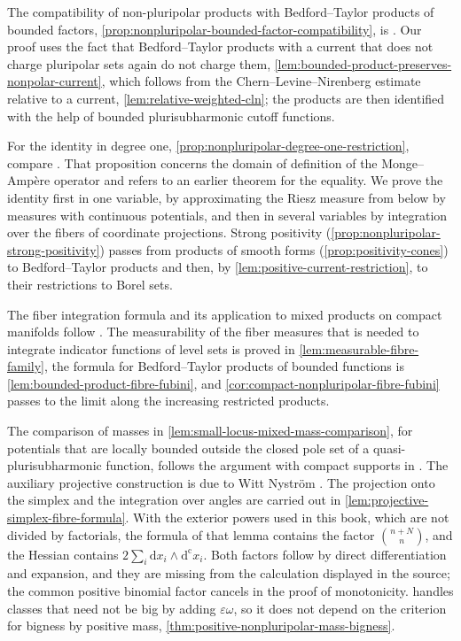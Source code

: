 The compatibility of non-pluripolar products with Bedford--Taylor products of bounded factors, \cref{prop:nonpluripolar-bounded-factor-compatibility}, is \cite[Proposition~2.2.1(iii)]{XiaSampleBook}. Our proof uses the fact that Bedford--Taylor products with a current that does not charge pluripolar sets again do not charge them, \cref{lem:bounded-product-preserves-nonpolar-current}, which follows from the Chern--Levine--Nirenberg estimate relative to a current, \cref{lem:relative-weighted-cln}; the products are then identified with the help of bounded plurisubharmonic cutoff functions.

For the identity in degree one, \cref{prop:nonpluripolar-degree-one-restriction}, compare \cite[Proposition 3.3]{ElKadiri2023v3}. That proposition concerns the domain of definition of the Monge--Amp\`ere operator and refers to an earlier theorem for the equality. We prove the identity first in one variable, by approximating the Riesz measure from below by measures with continuous potentials, and then in several variables by integration over the fibers of coordinate projections. Strong positivity (\cref{prop:nonpluripolar-strong-positivity}) passes from products of smooth forms (\cref{prop:positivity-cones}) to Bedford--Taylor products and then, by \cref{lem:positive-current-restriction}, to their restrictions to Borel sets.

The fiber integration formula and its application to mixed products on compact manifolds follow \cite[Chapter on non-pluripolar products, Lemma 2.1.1 and Corollary 2.2.1]{XiaSampleBook}. The measurability of the fiber measures that is needed to integrate indicator functions of level sets is proved in \cref{lem:measurable-fibre-family}, the formula for Bedford--Taylor products of bounded functions is \cref{lem:bounded-product-fibre-fubini}, and \cref{cor:compact-nonpluripolar-fibre-fubini} passes to the limit along the increasing restricted products.

The comparison of masses in \cref{lem:small-locus-mixed-mass-comparison}, for potentials that are locally bounded outside the closed pole set of a quasi-plurisubharmonic function, follows the argument with compact supports in \cite[Theorem 1.16 and its proof]{BEGZ10}. The auxiliary projective construction is due to Witt Nystr\"om \cite[Sections 3--4]{WN19}. The projection onto the simplex and the integration over angles are carried out in \cref{lem:projective-simplex-fibre-formula}. With the exterior powers used in this book, which are not divided by factorials, the formula of that lemma contains the factor $\binom{n+N}{n}$, and the Hessian contains $2\sum_i\mathrm dx_i\wedge\mathrm d^{\mathrm c}x_i$. Both factors follow by direct differentiation and expansion, and they are missing from the calculation displayed in the source; the common positive binomial factor cancels in the proof of monotonicity.  handles classes that need not be big by adding $\varepsilon\omega$, so it does not depend on the criterion for bigness by positive mass, \cref{thm:positive-nonpluripolar-mass-bigness}.

